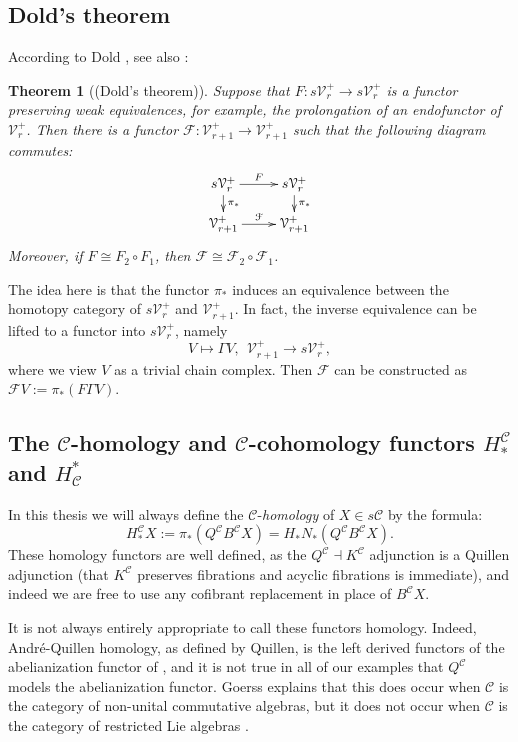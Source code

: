 \documentclass[11pt]{amsart} \renewcommand{\baselinestretch}{1.2}
\theoremstyle{plain}
\newtheorem{thm}{Theorem}[section]
\theoremstyle{definition}
\renewcommand{\to}{\longrightarrow}
\newcommand{\calF}{\mathcal{F}}
\newcommand{\calV}{\mathcal{V}}
\newcommand{\calc}{\mathcal{C}}
\newcommand{\citeBOX}[2][]{\cite[\mbox{#1}]{#2}}
\newcommand{\vect}[2]{\calV^{#1}_{#2}}
\renewcommand{\mapsto}{\longmapsto}
\begin{document}
\begin{Conventions and notation}
\subsection{Dold's theorem}
According to Dold \cite{DoldHomologySPs.pdf}, see also \citeBOX[Lemma 3.1]{ChingUnpublished}: 
\begin{thm}[(Dold's theorem)]
\label{Dold's theorem}
Suppose that $F:s\vect{+}{r}\to s\vect{+}{r}$ is a functor preserving weak equivalences, for example, the prolongation of an endofunctor of $\vect{+}{r}$. Then there is a functor $\calF:\vect{+}{r+1}\to\vect{+}{r+1}$ such that the following diagram commutes:
\[\xymatrix@R=4mm{
s\vect{+}{r}\ar[r]^-{F}
\ar[d]^-{\pi_*}
&%
s\vect{+}{r}\ar[d]^-{\pi_*}
\\%
\vect{+}{r+1}\ar[r]^-{\calF}
&
\vect{+}{r+1}
}\]
Moreover, if $F\cong {F}_2\circ {F}_1$, then $\calF\cong {\calF}_2\circ {\calF}_1$.
\end{thm}
\noindent The idea here is that the functor $\pi_*$ induces an equivalence between the homotopy category of $s\vect{+}{r}$ and $\vect{+}{r+1}$. In fact, the inverse equivalence can be lifted to a functor into $s\vect{+}{r}$, namely 
\[V\mapsto \Gamma V,\ \ \vect{+}{r+1}\to s\vect{+}{r},\]
where we view $V$ as a trivial chain complex. Then $\calF$ can be constructed as $\calF V:=\pi_*(F\Gamma V)$.


\subsection{The $\calc$-homology and $\calc$-cohomology functors $H^{\calc}_*$ and $H_{\calc}^*$}



In this thesis we will always define the $\calc$-\emph{homology} of $X\in s\calc$ by the formula:
\[H_*^{\calc}X:=\pi_*(Q^\calc B^\calc X)=H_*N_*(Q^\calc B^\calc X).\]
These homology functors are well defined, as the $Q^\calc\dashv K^\calc$ adjunction is a Quillen adjunction (that $K^\calc$ preserves fibrations and acyclic fibrations is immediate), and indeed we are free to use any cofibrant replacement in place of $B^\calc X$.

It is not always entirely appropriate to call these functors homology. Indeed, Andr\'e-Quillen homology, as defined by Quillen, is the left derived functors of the abelianization functor of \citeBOX[\S II.5]{QuillenHomAlg.pdf}, and it is not true in all of our examples that $Q^\calc$ models the abelianization functor. Goerss \citeBOX[\S4]{MR1089001} explains that this does occur when $\calc$ is the category of non-unital commutative algebras, but it does not occur when $\calc$ is the category of restricted Lie algebras \cite{MR2025911}.


\end{Conventions and notation}
\end{document}
